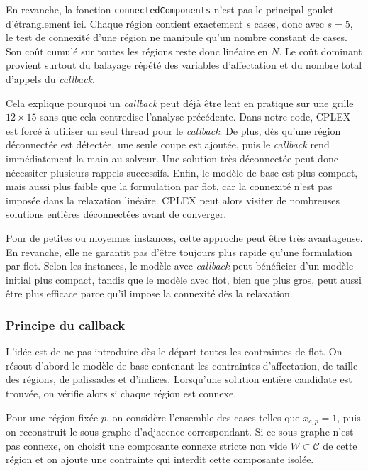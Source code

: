 En revanche, la fonction \texttt{connectedComponents} n'est pas le principal goulet d'étranglement ici. Chaque région contient exactement \(s\) cases, donc avec \(s = 5\), le test de connexité d'une région ne manipule qu'un nombre constant de cases. Son coût cumulé sur toutes les régions reste donc linéaire en \(N\). Le coût dominant provient surtout du balayage répété des variables d'affectation et du nombre total d'appels du \textit{callback}.

Cela explique pourquoi un \textit{callback} peut déjà être lent en pratique sur une grille \(12 \times 15\) sans que cela contredise l'analyse précédente. Dans notre code, CPLEX est forcé à utiliser un seul thread pour le \textit{callback}. De plus, dès qu'une région déconnectée est détectée, une seule coupe est ajoutée, puis le \textit{callback} rend immédiatement la main au solveur. Une solution très déconnectée peut donc nécessiter plusieurs rappels successifs. Enfin, le modèle de base est plus compact, mais aussi plus faible que la formulation par flot, car la connexité n'est pas imposée dans la relaxation linéaire. CPLEX peut alors visiter de nombreuses solutions entières déconnectées avant de converger.

Pour de petites ou moyennes instances, cette approche peut être très avantageuse. En revanche, elle ne garantit pas d'être toujours plus rapide qu'une formulation par flot. Selon les instances, le modèle avec \textit{callback} peut bénéficier d'un modèle initial plus compact, tandis que le modèle avec flot, bien que plus gros, peut aussi être plus efficace parce qu'il impose la connexité dès la relaxation.

\subsubsection{Principe du callback}

L'idée est de ne pas introduire dès le départ toutes les contraintes de flot. On résout d'abord le modèle de base contenant les contraintes d'affectation, de taille des régions, de palissades et d'indices. Lorsqu'une solution entière candidate est trouvée, on vérifie alors si chaque région est connexe.

Pour une région fixée \(p\), on considère l'ensemble des cases telles que \(x_{c,p} = 1\), puis on reconstruit le sous-graphe d'adjacence correspondant. Si ce sous-graphe n'est pas connexe, on choisit une composante connexe stricte non vide \(W \subset \mathcal{C}\) de cette région et on ajoute une contrainte qui interdit cette composante isolée.


